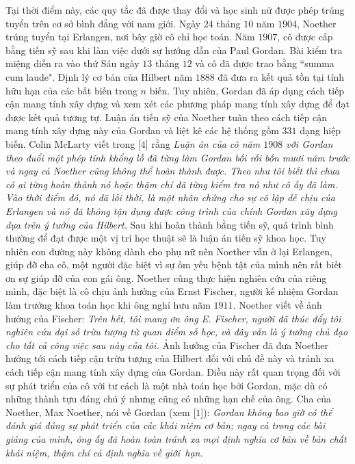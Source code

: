 \begin{multicols}{2}
	\vskip 0.05cm
	Tại thời điểm này, các quy tắc đã được thay đổi và học sinh nữ được phép trúng tuyển trên cơ sở bình đẳng với nam giới. Ngày $24$ tháng $10$ năm $1904$, Noether trúng tuyển tại Erlangen, nơi bây giờ cô chỉ học toán. Năm $1907$, cô được cấp bằng tiến sỹ sau khi làm việc dưới sự hướng dẫn của Paul Gordan. Bài kiểm tra miệng diễn ra vào thứ Sáu ngày $13$ tháng $12$ và cô đã được trao bằng ``summa cum laude". Định lý cơ bản của Hilbert năm $1888$ đã đưa ra kết quả tồn tại tính hữu hạn của các bất biến trong $n$ biến. Tuy nhiên, Gordan đã áp dụng cách tiếp cận mang tính xây dựng và xem xét các phương pháp mang tính xây dựng để đạt được kết quả tương tự. Luận án tiến sỹ của Noether tuân theo cách tiếp cận mang tính xây dựng này của Gordan và liệt kê các hệ thống gồm $331$ dạng hiệp biến. Colin McLarty viết trong [$4$] rằng
	\vskip 0.05cm
	\textit{Luận án của cô năm $1908$ với Gordan theo đuổi một phép tính khổng lồ đã từng làm Gordan bối rối bốn mươi năm trước và ngay cả Noether cũng không thể hoàn thành được. Theo như tôi biết thì chưa có ai từng hoàn thành nó hoặc thậm chí đã từng kiểm tra nó như cô ấy đã làm. Vào thời điểm đó, nó đã lỗi thời, là một nhân chứng cho sự cô lập dễ chịu của Erlangen và  nó đã không tận dụng được công trình của chính Gordan xây dựng dựa trên ý tưởng của Hilbert.}
	\vskip 0.05cm
	Sau khi hoàn thành bằng tiến sỹ, quá trình bình thường để đạt được một vị trí học thuật sẽ là luận án tiến sỹ khoa học. Tuy nhiên con đường này không dành cho phụ nữ nên Noether vẫn ở lại Erlangen, giúp đỡ cha cô, một người đặc biệt vì sự ốm yếu bệnh tật của mình nên rất biết ơn sự giúp đỡ của con gái ông. Noether cũng thực hiện nghiên cứu của riêng mình, đặc biệt là cô chịu ảnh hưởng của Ernst Fischer, người kế nhiệm Gordan làm trưởng khoa toán học khi ông nghỉ hưu năm $1911$. Noether viết về ảnh hưởng của Fischer:
	\vskip 0.05cm
	\textit{Trên hết, tôi mang ơn ông E. Fischer, người đã thúc đẩy tôi nghiên cứu đại số trừu tượng từ quan điểm số học, và đây vẫn là ý tưởng chủ đạo cho tất cả công việc sau này của tôi.}
	\vskip 0.05cm
	Ảnh hưởng của Fischer đã đưa Noether hướng tới cách tiếp cận trừu tượng của Hilbert đối với chủ đề này và tránh xa cách tiếp cận mang tính xây dựng của Gordan. Điều này rất quan trọng đối với sự phát triển của cô với tư cách là một nhà toán học bởi  Gordan, mặc dù có những thành tựu đáng chú ý nhưng cũng có những hạn chế của ông. Cha của Noether, Max Noether, nói về Gordan (xem [$1$]):
	\vskip 0.05cm
	\textit{Gordan không bao giờ có thể đánh giá đúng sự phát triển của các khái niệm cơ bản; ngay cả trong các bài giảng của mình, ông ấy đã hoàn toàn tránh xa mọi định nghĩa cơ bản về bản chất khái niệm, thậm chí cả định nghĩa về giới~hạn.}

\end{multicols}
